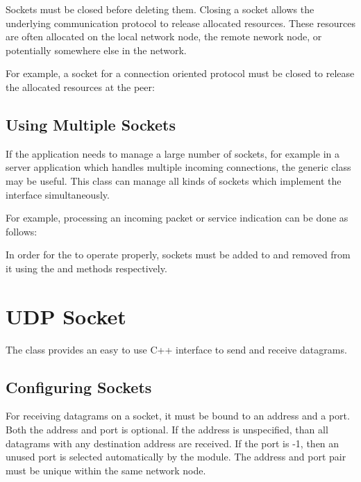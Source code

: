 Sockets must be closed before deleting them. Closing a socket allows the
underlying communication protocol to release allocated resources. These
resources are often allocated on the local network node, the remote nework node,
or potentially somewhere else in the network.

For example, a socket for a connection oriented protocol must be closed to
release the allocated resources at the peer:


\subsection*{Using Multiple Sockets}

If the application needs to manage a large number of sockets, for example in a
server application which handles multiple incoming connections, the generic
 class may be useful. This class can manage all kinds of
sockets which implement the  interface simultaneously.

For example, processing an incoming packet or service indication can be done as
follows:


In order for the  to operate properly, sockets must be added
to and removed from it using the  and 
methods respectively.

\section{UDP Socket}

The  class provides an easy to use C++ interface to send and
receive  datagrams.

\subsection*{Configuring Sockets}

For receiving  datagrams on a socket, it must be bound to an
address and a port. Both the address and port is optional. If the address is
unspecified, than all  datagrams with any destination address are
received. If the port is -1, then an unused port is selected automatically by
the  module. The address and port pair must be unique within the
same network node.

